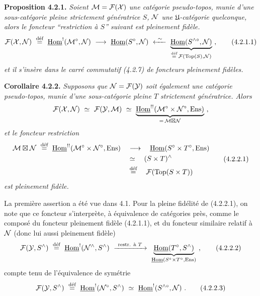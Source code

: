 \textbf{Proposition 4.2.1.} \textit{Soient $\cM=\cF(\cX)$ une catégorie pseudo-topos, munie d'une sous-catégorie pleine strictement génératrice $S$, $\cN$ une $\mathfrak{U}$-catégorie quelconque, alors le foncteur “restriction à $S$” suivant est pleinement fidèle.}
\[
\cF(\cX,\cN) \ \defeq\ \uHom^{!}(\cM^{\circ},\cN) \ \longrightarrow\ \uHom(S^{\circ},\cN) \ \xleftarrow{\ \sim\ }\ \underbrace{\uHom(S^{\wedge\circ},\cN)}_{\defeq\, \cF(\Top(S),\cN)} \ ,
\tag*{(4.2.1.1)}
\]
\textit{et il s'insère dans le carré commutatif (4.2.7) de foncteurs pleinement fidèles.}

\textbf{Corollaire 4.2.2.} \textit{Supposons que $\cN=\cF(\cY)$ soit également une catégorie pseudo-topos, munie d'une sous-catégorie pleine $T$ strictement génératrice. Alors}
\[
\cF(\cX,\cN) \ \simeq\ \cF(\cY,\cM) \ \simeq\ \underbrace{\uHom^{!!}(\cM^{\circ}\times\cN^{\circ},\Ens)}_{=\,\cM\bt\cN} \ ,
\]
\textit{et le foncteur restriction}
\[
\begin{aligned}
\cM\bt\cN \ \defeq\ \uHom^{!!}(\cM^{\circ}\times\cN^{\circ},\Ens) \quad &\longrightarrow \quad \uHom(S^{\circ}\times T^{\circ},\Ens)\\
&\simeq \quad (S\times T)^{\wedge}\\
&\defeq \quad \cF(\Top(S\times T))
\end{aligned}
\tag*{(4.2.2.1)}
\]
\textit{est pleinement fidèle.}

La première assertion a été vue dans 4.1. Pour la pleine fidélité de (4.2.2.1), on note que ce foncteur s'interprète, à équivalence de catégories près, comme le composé du foncteur pleinement fidèle (4.2.1.1), et du foncteur
similaire relatif à $\cN$ (donc lui aussi pleinement fidèle)
\[
\cF(\cY,S^{\wedge}) \ \defeq\ \uHom^{!}(\cN^{\wedge},S^{\wedge}) \ \xrightarrow{\ \text{restr. à } T\ }\ \underbrace{\uHom(T^{\circ},S^{\wedge})}_{\uHom(S^{\circ}\times T^{\circ},\Ens)} \ ,
\tag*{(4.2.2.2)} %
\]
compte tenu de l'équivalence de symétrie
\[
\cF(\cY,S^{\wedge}) \ \defeq\ \uHom^{!}(\cN^{\circ},S^{\wedge}) \ \simeq\ \uHom^{!}(S^{\wedge\circ},\cN) \ .
\tag*{(4.2.2.3)}
\]

